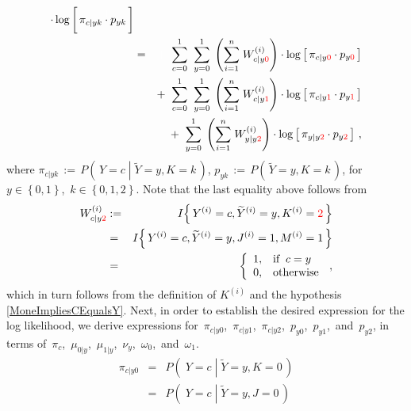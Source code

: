\begin{enumerate}
\begin{eqnarray*}
	\cdot
	\log\left[\,
		\pi_{c \vert yk} \overset{{\color{white}\vert}}{\cdot} p_{yk}
	\,\right]
\\
&=&
	{\color{white}+} \;\;
	\overset{1}{\underset{c=0}{\sum}}\;\;
	\overset{1}{\underset{y=0}{\sum}}\;
	\left(\overset{n}{\underset{i=1}{\sum}}\;W^{(i)}_{c \vert y{\color{red}0}}\right)
	\cdot
	\log\left[\,
		\pi_{c \vert y\color{red}0} \cdot p_{y\color{red}0}
	\,\right]
\\
&&
	+ \;\;
	\overset{1}{\underset{c=0}{\sum}}\;\;
	\overset{1}{\underset{y=0}{\sum}}\;
	\left(\overset{n}{\underset{i=1}{\sum}}\;W^{(i)}_{c \vert y{\color{red}1}}\right)
	\cdot
	\log\left[\,
		\pi_{c \vert y\color{red}1} \cdot p_{y\color{red}1}
	\,\right]
\\
&&
	+ \;\;
	\overset{1}{\underset{y=0}{\sum}}\;
	\left(\overset{n}{\underset{i=1}{\sum}}\;W^{(i)}_{y \vert y{\color{red}2}}\right)
	\cdot
	\log\left[\,
		\pi_{y \vert y\color{red}2} \cdot p_{y\color{red}2}
	\,\right]\,,
\end{eqnarray*}
where
\;$\pi_{c \vert yk} \, := \, P\!\left(\,Y=c\;\left\vert\;\widetilde{Y}=y,K=k\right.\,\right)$,
\;$p_{yk} \, := \, P\!\left(\,\widetilde{Y}=y,K=k\,\right)$,
\;for
\;$y \in \left\{0,1\right\}$,
\,$k \in \left\{0,1,2\right\}$.
\;Note that the last equality above follows from
\begin{eqnarray*}
W^{(i)}_{c \vert y{\color{red}2}}
&:=&
	I\!\left\{\,Y^{(i)}=c,\widetilde{Y}^{(i)}=y,K^{(i)}={\color{red}2}\,\right\}
\\
&=&
	I\!\left\{\,Y^{(i)}=c,\widetilde{Y}^{(i)}=y,J^{(i)}=1,M^{(i)}=1\,\right\}
\\
&=&
	\left\{\begin{array}{cl}
		1, & \textnormal{if}\;\; c = y
		\\
		0, & \textnormal{otherwise}
	\end{array}\right.\,,
\end{eqnarray*}
which in turn follows from the definition of $K^{(i)}$ and
the hypothesis \eqref{MoneImpliesCEqualsY}.
Next, in order to establish the desired expression for the log likelihood,
we derive expressions for
\,$\pi_{c \vert y0}$,
\,$\pi_{c \vert y1}$,
\,$\pi_{c \vert y2}$,
\,$p_{y0}$,
\,$p_{y1}$,
\,and
\,$p_{y2}$,
in terms of
\,$\pi_{c}$,
\,$\mu_{0 \vert y}$,
\,$\mu_{1 \vert y}$,
\,$\nu_{y}$,
\,$\omega_{0}$,
\,and
\,$\omega_{1}$.
\begin{eqnarray*}
\pi_{c \vert y0}
&=&
	P\!\left(\;Y=c\;\left\vert\;\widetilde{Y}=y,K=0\right.\,\right)
\\
&=&
	P\!\left(\;Y=c\;\left\vert\;\widetilde{Y}=y,J=0\right.\,\right)

\end{eqnarray*}
\end{enumerate}
